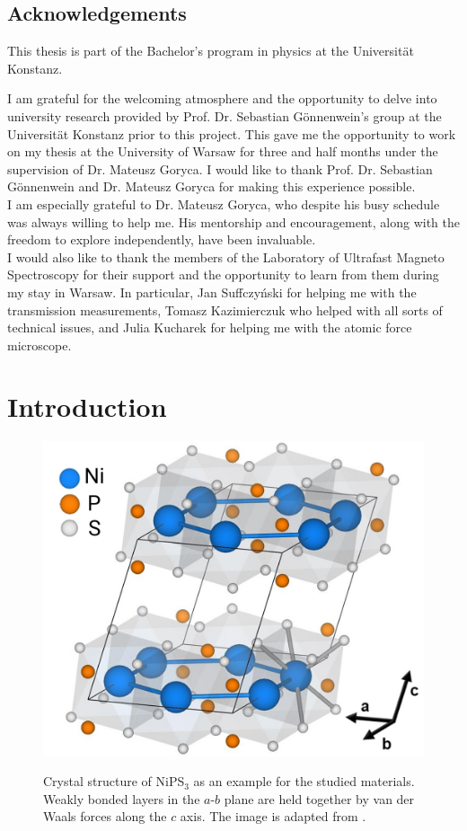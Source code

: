 \documentclass[
	twoside,
	parskip=half,
	a4paper,
]{scrbook}
\begin{document}
\clearpage
\section*{Acknowledgements}
This thesis is part of the Bachelor's program in physics at the Universität Konstanz.

I am grateful for the welcoming atmosphere and the opportunity to delve into university research provided by Prof. Dr. Sebastian Gönnenwein's group at the Universität Konstanz prior to this project.
This gave me the opportunity to work on my thesis at the University of Warsaw for three and half months under the supervision of Dr. Mateusz Goryca.
I would like to thank Prof. Dr. Sebastian Gönnenwein and Dr. Mateusz Goryca for making this experience possible.\\
I am especially grateful to Dr. Mateusz Goryca, who despite his busy schedule was always willing to help me.
His mentorship and encouragement, along with the freedom to explore independently, have been invaluable.\\
I would also like to thank the members of the Laboratory of Ultrafast Magneto Spectroscopy for their support and the opportunity to learn from them during my stay in Warsaw.
In particular, Jan Suffczyński for helping me with the transmission measurements, Tomasz Kazimierczuk who helped with all sorts of technical issues, and Julia Kucharek for helping me with the atomic force microscope.

\cleardoublepage
{
	\sffamily
	\hypersetup{hidelinks}
	\tableofcontents
}

\mainmatter

\chapter{Introduction}
\begin{figure}
	\includegraphics[width=.4\textwidth]{../../figures/crystal structures/NiPS3 3d.png}\\
	\caption{}
	Crystal structure of NiPS$_3$ as an example for the studied materials.
	Weakly bonded layers in the $a$-$b$ plane are held together by van der Waals forces along the $c$ axis.
	The image is adapted from \cite{NiPS3_coherent}.
	\label{fig:crystal structure}
\end{figure}
\end{document}
